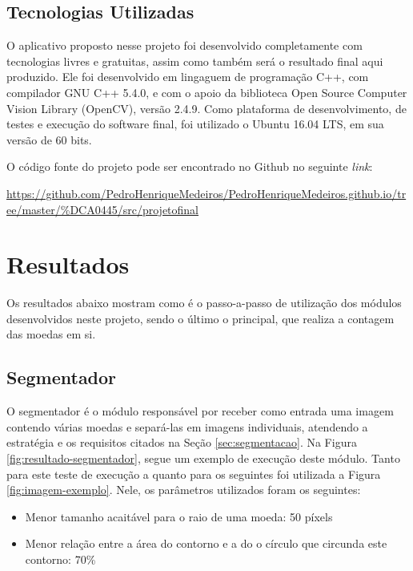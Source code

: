 \documentclass[10pt,journal,compsoc]{IEEEtran}
\begin{document}
\subsection{Tecnologias Utilizadas}
\label{sec:tecnologias-envolvidas}

O aplicativo proposto nesse projeto foi desenvolvido completamente com tecnologias livres e gratuitas, assim como também será o resultado final aqui produzido. Ele foi desenvolvido em lingaguem de programação C++, com compilador GNU C++ 5.4.0, e com o apoio da biblioteca Open Source Computer Vision Library (OpenCV), versão 2.4.9. Como plataforma de desenvolvimento, de testes e execução do software final, foi utilizado o Ubuntu 16.04 LTS, em sua versão de 60 bits.

O código fonte do projeto pode ser encontrado no Github no seguinte \textit{link}:

\url{https://github.com/PedroHenriqueMedeiros/PedroHenriqueMedeiros.github.io/tree/master/%DCA0445/src/projetofinal}

\section{Resultados}
\label{sec:resultados}

Os resultados  abaixo mostram como é o passo-a-passo de utilização dos módulos desenvolvidos neste projeto, sendo o último o principal, que realiza a contagem das moedas em si. 

\subsection{Segmentador}
\label{sec:segmentador}

O segmentador é o módulo responsável por receber como entrada uma imagem contendo várias moedas e separá-las em imagens individuais, atendendo a estratégia e os requisitos citados na Seção \ref{sec:segmentacao}. Na Figura \ref{fig:resultado-segmentador}, segue um exemplo de execução deste módulo. Tanto para este teste de execução a quanto para os seguintes foi utilizada a Figura \ref{fig:imagem-exemplo}. Nele, os parâmetros utilizados foram os seguintes:

\begin{itemize}  
\item Menor tamanho acaitável para o raio de uma moeda: 50 píxels
\item Menor relação entre a área do contorno e a do o círculo que circunda este contorno: 70\%
\end{itemize}
\end{document}

